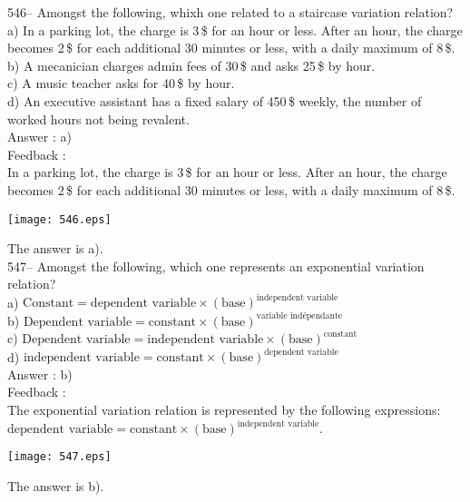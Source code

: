 \documentclass[letterpaper, 12pt]{article}
\begin{document}
546-- Amongst the following, whixh one related to a staircase variation relation?\\
a) In a parking lot, the charge is 3\,\$ for an hour or less. After an hour, the charge becomes 2\,\$ for each additional 30 minutes or less, with a daily maximum of 8\,\$.  \\
b) A mecanician charges admin fees of 30\,\$ and asks 25\,\$ by hour.\\
c) A music teacher asks for 40\,\$ by hour.\\
d) An executive assistant has a fixed salary of 450\,\$ weekly, the number of worked hours not being revalent.\\

Answer : a) \\

Feedback : \\
In a parking lot, the charge is 3\,\$ for an hour or less. After an hour, the charge becomes 2\,\$ for each additional 30 minutes or less, with a daily maximum of 8\,\$.
   \begin{center}
    \texttt{[image: 546.eps]}
    \end{center}
The answer is a).\\

547-- Amongst the following, which one represents an exponential variation relation?\\[2mm]
a) $\textrm{Constant}=\textrm{dependent variable}\times\left(\textrm{base}\right) ^{\textrm{independent variable}}$\\[2mm]
b) $\textrm{Dependent variable}=\textrm{constant}\times\left(\textrm{base}\right)
^{\textrm{variable ind\'ependante}}$\\[2mm]
c) $\textrm{Dependent variable}=\textrm{independent variable}\times\left(\textrm{base}\right)
^{\textrm{constant}}$\\ [2mm]
d) $\textrm{independent variable}=\textrm{constant}\times\left(\textrm{base}\right)
^{\textrm{dependent variable}}$\\

Answer : b)\\

Feedback : \\
The exponential variation relation is represented by the following expressions:\\[2mm]
$\textrm{dependent variable}=\textrm{constant}\times\left(\textrm{base}\right)
^{\textrm{independent variable}}.$\\[2mm]
   \begin{center}
    \texttt{[image: 547.eps]}
    \end{center}
The answer is b).\\
\end{document}
